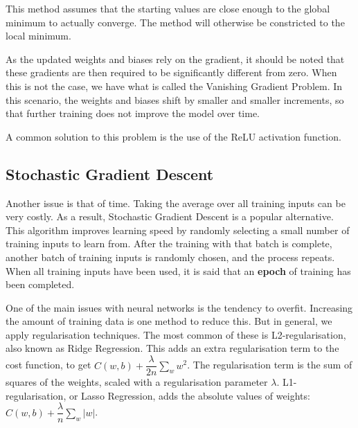 \documentclass[honours,12pt]{unswthesis}
\numberwithin{equation}{section}
\begin{document}
This method assumes that the starting values are close enough to the global minimum to actually converge. The method will otherwise be constricted to the local minimum.

As the updated weights and biases rely on the gradient, it should be noted that these gradients are then required to be significantly different from zero. When this is not the case, we have what is called the Vanishing Gradient Problem. In this scenario, the weights and biases shift by smaller and smaller increments, so that further training does not improve the model over time.

A common solution to this problem is the use of the ReLU activation function. 

\subsection{Stochastic Gradient Descent}\label{nnets-stochgraddesc}

Another issue is that of time. Taking the average over all training inputs can be very costly. As a result, Stochastic Gradient Descent is a popular alternative. This algorithm improves learning speed by randomly selecting a small number of training inputs to learn from. After the training with that batch is complete, another batch of training inputs is randomly chosen, and the process repeats. When all training inputs have been used, it is said that an \textbf{epoch} of training has been completed.

%
%
%






One of the main issues with neural networks is the tendency to overfit. Increasing the amount of training data is one method to reduce this. But in general, we apply regularisation techniques. The most common of these is L2-regularisation, also known as Ridge Regression.
This adds an extra regularisation term to the cost function, to get $C(w,b) + \dfrac{\lambda}{2n}\sum_{w}w^2$. The regularisation term is the sum of squares of the weights, scaled with a regularisation parameter $\lambda$. 
L1-regularisation, or Lasso Regression, adds the absolute values of weights: $C(w,b) + \dfrac{\lambda}{n}\sum_w|w|$.
\end{document}
